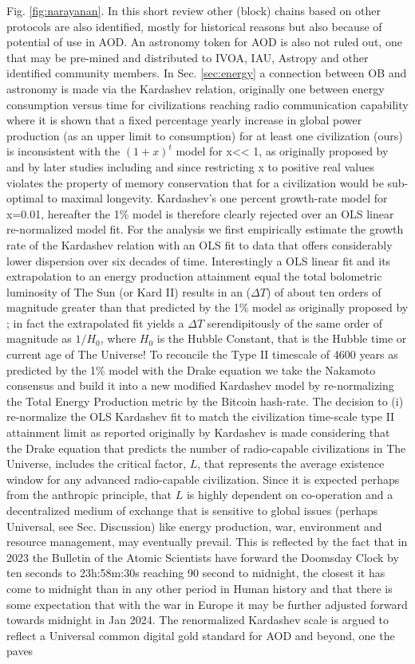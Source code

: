 \documentclass[final,5p,times,twocolumn,authoryear]{elsarticle}
\begin{document}
Fig. \ref{fig:narayanan}. In this short review other (block) chains based on other protocols are also identified, mostly for historical reasons but also because of potential of use in AOD. An astronomy token for AOD is also not ruled out, one that may be pre-mined and distributed to IVOA, IAU, Astropy and other identified community members. In Sec. \ref{sec:energy} a connection between OB and astronomy is made via the Kardashev relation, originally one between energy consumption versus time for civilizations reaching radio communication capability where it is shown that a fixed percentage yearly increase in global power production (as an upper limit to consumption) for at least one civilization (ours) is inconsistent with the $(1+x)^{t}$ model for x<< 1, as originally proposed by \cite{kar64} and by later studies including \cite{sagan73} and \cite{gray2020} since restricting x to positive real values violates the property of memory conservation that for a civilization would be sub-optimal to maximal longevity. Kardashev's one percent growth-rate model for x=0.01, hereafter the 1\% model is therefore clearly rejected over an OLS linear re-normalized model fit. For the analysis we first empirically estimate the growth rate of the Kardashev relation with an OLS fit to data that offers considerably lower dispersion over six decades of time. Interestingly a OLS linear fit and its extrapolation to an energy production attainment equal the total bolometric luminosity of The Sun (or Kard II) results in an ($\Delta T$) of about ten orders of magnitude greater than that predicted by the 1\% model as originally proposed by \cite{kar64}; in fact the extrapolated fit yields a $\Delta T$ serendipitously of the same order of magnitude as $1/H{_0}$, where $H_{0}$ is the Hubble Constant, that is the Hubble time or current age of The Universe! To reconcile the Type II timescale of 4600 years as predicted by the 1\% model with the Drake equation we take the Nakamoto consensus and build it into a new modified Kardashev model by re-normalizing the Total Energy Production metric by the Bitcoin hash-rate. The decision to (i) re-normalize the OLS Kardashev fit to match the civilization time-scale type II attainment limit as reported originally by Kardashev is made considering that the Drake equation that predicts the number of radio-capable civilizations in The Universe, includes the critical factor, $L$, that represents the average existence window for any advanced radio-capable civilization. Since it is expected perhaps from the anthropic principle, that $L$ is highly dependent on co-operation and a decentralized medium of exchange that is sensitive to global issues (perhaps Universal, see Sec. Discussion) like energy production, war, environment and resource management, may eventually prevail. This is reflected by the fact that in 2023 the Bulletin of the Atomic Scientists have forward the Doomsday Clock by ten seconds to 23h:58m:30s reaching 90 second to midnight, the closest it has come to midnight than in any other period in Human history and that there is some expectation that with the war in Europe it may be further adjusted forward towards midnight in Jan 2024. The renormalized Kardashev scale is argued to reflect a Universal common digital gold standard for AOD and beyond, one the paves 
\end{document}
